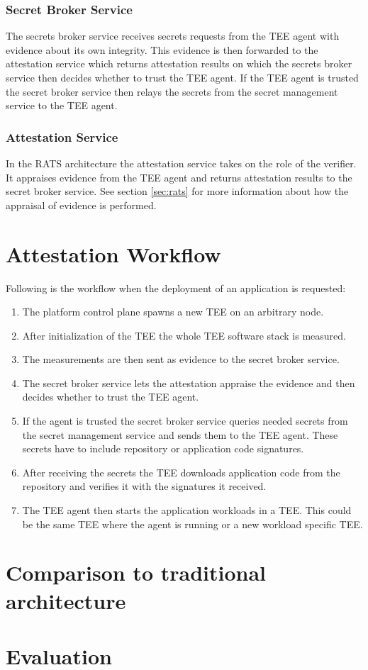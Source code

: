 \subsubsection{Secret Broker Service}

The secrets broker service receives secrets requests from the TEE agent with
evidence about its own integrity. This evidence is then forwarded to the
attestation service which returns attestation results on which the secrets
broker service then decides whether to trust the TEE agent. If the TEE agent is
trusted the secret broker service then relays the secrets from the secret
management service to the TEE agent.

\subsubsection{Attestation Service}

In the RATS architecture the attestation service takes on the role of the
verifier. It appraises evidence from the TEE agent and returns attestation
results to the secret broker service. See section \ref{sec:rats} for more
information about how the appraisal of evidence is performed.

\section{Attestation Workflow}
\label{sec:proposal:attestation-workflow}

Following is the workflow when the deployment of an application is requested:

\begin{enumerate}
  \item The platform control plane spawns a new TEE on an arbitrary node.
  \item After initialization of the TEE the whole TEE software stack is
        measured.
  \item The measurements are then sent as evidence to the secret broker service.
  \item The secret broker service lets the attestation appraise the evidence and
        then decides whether to trust the TEE agent.
  \item If the agent is trusted the secret broker service queries needed secrets
        from the secret management service and sends them to the TEE agent.
        These secrets have to include repository or application code signatures.
  \item After receiving the secrets the TEE downloads application code from the
        repository and verifies it with the signatures it received.
  \item The TEE agent then starts the application workloads in a TEE. This could
        be the same TEE where the agent is running or a new workload specific
        TEE.
\end{enumerate}

\section{Comparison to traditional architecture}


\section{Evaluation}
